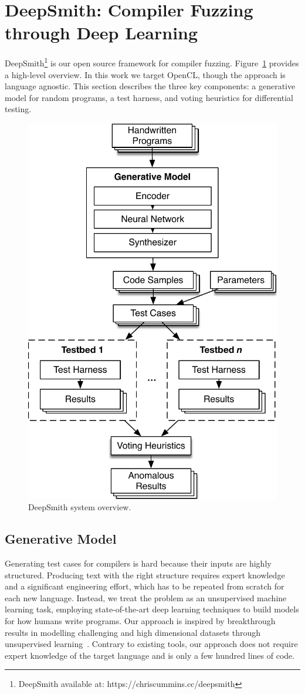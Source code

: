 \section{DeepSmith: Compiler Fuzzing through Deep Learning}

DeepSmith\footnote{DeepSmith available at: https://chriscummins.cc/deepsmith} is
our open source framework for compiler fuzzing. Figure~\ref{fig:deeptune}
provides a high-level overview. In this work we target OpenCL, though the
approach is language agnostic. This section describes the three key components:
a generative model for random programs, a test harness, and voting heuristics
for differential testing.

\begin{figure}
  \centering
  \includegraphics[width=.55\columnwidth]{img/deepsmith}
  \caption{%
  DeepSmith system overview.
  }%
  \label{fig:deeptune}
\end{figure}

\subsection{Generative Model}

Generating test cases for compilers is hard because their inputs are highly
structured. Producing text with the right structure requires expert knowledge
and a significant engineering effort, which has to be repeated from scratch for
each new language. Instead, we treat the problem as an unsupervised machine
learning task, employing state-of-the-art deep learning techniques to build
models for how humans write programs. Our approach is inspired by breakthrough
results in modelling challenging and high dimensional datasets through
unsupervised learning~\cite{Raghu2016,Radford2016b,Bowman2015}. Contrary to
existing tools, our approach does not require expert knowledge of the target
language and is only a few hundred lines of code.

